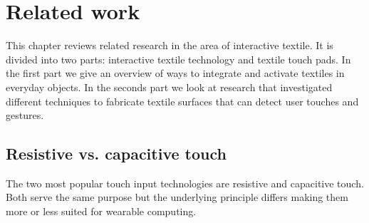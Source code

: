 %

\chapter{Related work}
\label{relatedwork}
This chapter reviews related research in the area of interactive textile. It is divided into two parts: interactive textile technology and textile touch pads. In the first part we give an overview of ways to integrate and activate textiles in everyday objects. In the seconds part we look at research that investigated different techniques to fabricate textile surfaces that can detect user touches and gestures.

\section{Resistive vs. capacitive touch}
The two most popular touch input technologies are resistive and capacitive touch. Both serve the same purpose but the underlying principle differs making them more or less suited for wearable computing. 

